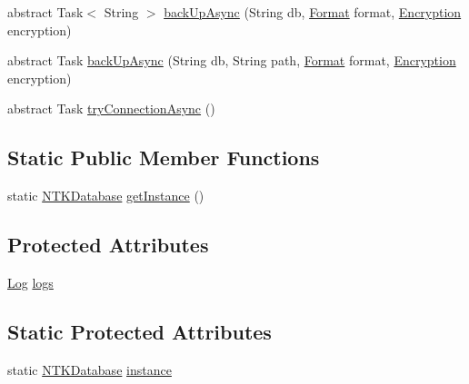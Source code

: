 \begin{DoxyCompactItemize}
abstract Task$<$ String $>$ \mbox{\hyperlink{class_n_t_k_1_1_database_1_1_n_t_k_database_aee189c0bf028b32a887a7c167dc750d1}{back\+Up\+Async}} (String db, \mbox{\hyperlink{namespace_n_t_k_1_1_database_a9bed700210ca4ed5854002637b664789}{Format}} format, \mbox{\hyperlink{namespace_n_t_k_1_1_database_aa21afe93187a6c77c4ccdc988b3c4ac2}{Encryption}} encryption)
\item 
abstract Task \mbox{\hyperlink{class_n_t_k_1_1_database_1_1_n_t_k_database_a15f1abcea4491908469b94547605d717}{back\+Up\+Async}} (String db, String path, \mbox{\hyperlink{namespace_n_t_k_1_1_database_a9bed700210ca4ed5854002637b664789}{Format}} format, \mbox{\hyperlink{namespace_n_t_k_1_1_database_aa21afe93187a6c77c4ccdc988b3c4ac2}{Encryption}} encryption)
\item 
abstract Task \mbox{\hyperlink{class_n_t_k_1_1_database_1_1_n_t_k_database_a59d2820fbd047c1b11c73aabbf390ebb}{try\+Connection\+Async}} ()
\end{DoxyCompactItemize}
\subsection*{Static Public Member Functions}
\begin{DoxyCompactItemize}
\item 
static \mbox{\hyperlink{class_n_t_k_1_1_database_1_1_n_t_k_database}{N\+T\+K\+Database}} \mbox{\hyperlink{class_n_t_k_1_1_database_1_1_n_t_k_database_a3028e8e62ca52a88988020c567efea06}{get\+Instance}} ()
\end{DoxyCompactItemize}
\subsection*{Protected Attributes}
\begin{DoxyCompactItemize}
\item 
\mbox{\hyperlink{class_n_t_k_1_1_i_o_1_1_log}{Log}} \mbox{\hyperlink{class_n_t_k_1_1_database_1_1_n_t_k_database_a85ba1fee5a64697b435f2464bfde163e}{logs}}
\end{DoxyCompactItemize}
\subsection*{Static Protected Attributes}
\begin{DoxyCompactItemize}
\item 
static \mbox{\hyperlink{class_n_t_k_1_1_database_1_1_n_t_k_database}{N\+T\+K\+Database}} \mbox{\hyperlink{class_n_t_k_1_1_database_1_1_n_t_k_database_a66463cea15f30c1bfb12c36c55a5e0e1}{instance}}
\end{DoxyCompactItemize}
